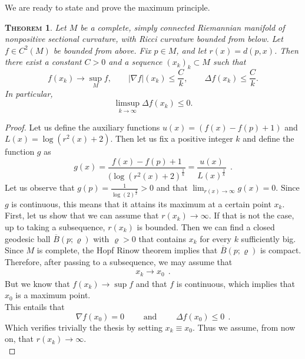 \documentclass[a4paper,11pt,openright,twoside]{book}
\renewcommand{\rho}{\varrho}
\newcommand{\1}{\mathds{1}}
\theoremstyle{plain}
\newtheorem{thm}{\textsc{Theorem}}[chapter]
\theoremstyle{definition}
\theoremstyle{remark}
\begin{document}
We are ready to state and prove the maximum principle.
\begin{thm}\label{th:maxprin}
Let $M$ be a complete, simply connected Riemannian manifold of nonpositive sectional curvature, with Ricci curvature bounded from below. Let $f\in C^2(M)$ be bounded from above. Fix $p\in M$, and let $r(x)=d(p,x)$. Then there exist a constant $C>0$ and a sequence $(x_k)_k\subset M$ such that
\[
f(x_k)\to \sup_M f,\qquad |\nabla f|(x_k)\le \frac{C}{k},\qquad \Delta f(x_k)\le \frac{C}{k}.
\]
In particular,
\[
\limsup_{k\to\infty}\Delta f(x_k)\le 0.
\]
\end{thm}
\begin{proof}
	Let us define the auxiliary functions $u(x) = (f(x)-f(p)+1) $ and $L(x) = \log(r^2(x)+2)$. Then let us fix a positive integer $k$ and define the function $g$ as
	\begin{equation*}
		g (x) = \frac{f(x)-f(p)+1}{(\log(r^2(x) +2)^{\frac{1}{k}}} = \frac{u(x)}{L(x)^\frac{1}{k}}
		\ \ .
	\end{equation*} 
	Let us observe that $g(p) = \frac{1}{\log(2)^\frac{1}{k}}>0$ and that $\lim_{r(x) \to \infty}g(x) = 0$. Since $g$ is continuous, this means that it attains its maximum at a certain point $x_k$.\\

	First, let us show that we can assume that $r(x_k) \to  \infty$. If that is not the case, up to taking a subsequence, $r(x_k)$ is bounded.
	Then we can find a closed geodesic ball $\overline{B}(p;\rho)$ with $\rho>0$ that contains $x_k$ for every $k$ sufficiently big. Since $M$ is complete, the Hopf Rinow theorem implies that $\overline{B}(p;\rho)$ is compact. Therefore, after passing to a subsequence, we may assume that 
	\begin{align*}
		x_k \to x_0
	\ \ .
	\end{align*}
	But we know that $f(x_k) \to \sup f$ and that $ f$ is continuous, which implies that $x_0$ is a maximum point.\\
	This entails that 
	\[ \nabla f(x_0) = 0\qquad \text{ and } \qquad \Delta f(x_0) \leq 0\ \ .\]
	Which verifies trivially the thesis by setting $x_k \equiv x_0$. Thus we assume, from now on, that $r(x_k)\to \infty$.\\


\end{proof}
\end{document}
